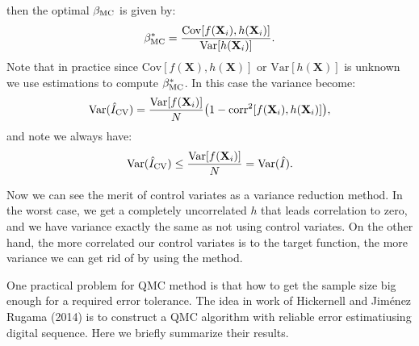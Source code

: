 then the optimal $\beta_{\mathrm{MC}}$ is given by: 
\begin{equation}
    \beta_{\mathrm{MC}}^*=\frac{\mathrm{Cov}[f(\mathbf{X}_i),h(\mathbf{X}_i)]}{\mathrm{Var}[h(\mathbf{X}_i)]}.
    \label{eq:optBeta}
\end{equation}
Note that in practice since $\mathrm{Cov}[f(\mathbf{X}),h(\mathbf{X})]$ or $\mathrm{Var}[h(\mathbf{X})]$ is unknown we use estimations to compute $\beta_{\mathrm{MC}}^*$.  
In this case the variance become:
\[
    \mathrm{Var}(\hat{I}_{\mathrm{CV}})= \frac{\mathrm{Var}[f(\mathbf{X}_i)]}{N}\big(1-\mathrm{corr}^2[f(\mathbf{X}_i), h(\mathbf{X}_i)]\big),
\]
and note we always have: 
\[
\mathrm{Var}(\hat{I}_{\mathrm{CV}}) \leq \frac{\mathrm{Var}[f(\mathbf{X}_i)]}{N}=\mathrm{Var}(\hat{I}).
\]

Now we can see the merit of control variates as a variance reduction method. 
In the worst case, we get a completely uncorrelated $h$ that leads correlation to zero, and we have variance exactly the same as not using control variates. On the other hand, the more correlated our control variates is to the target function, the more variance we can get rid of by using the method.


One practical problem for QMC method is that how to get the sample size big enough for a required error tolerance. 
The idea in work of Hickernell and Jim{\'e}nez Rugama (2014)\cite{hickernell2014reliable} is to construct a QMC algorithm with reliable error estimatiusing digital sequence. 
Here we briefly summarize their results.

